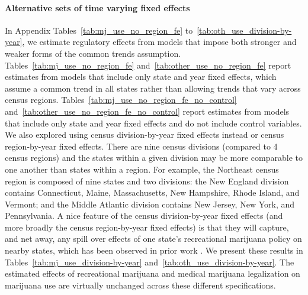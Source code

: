\documentclass[12pt]{article}%
\begin{document}
\paragraph{Alternative sets of time varying fixed effects}
In Appendix Tables~\ref{tab:mj_use_no_region_fe} to~\ref{tab:oth_use_division-by-year}, we estimate regulatory effects from models that impose both stronger and weaker forms of the common trends assumption. Tables~\ref{tab:mj_use_no_region_fe} and~\ref{tab:other_use_no_region_fe} report estimates from models that include only state and year fixed effects, which assume a common trend in all states rather than allowing trends that vary across census regions. Tables~\ref{tab:mj_use_no_region_fe_no_control} and~\ref{tab:other_use_no_region_fe_no_control} report estimates from models that include only state and year fixed effects and do not include control variables. 
We also explored using census division-by-year fixed effects instead or census region-by-year fixed effects. 
There are nine census divisions (compared to 4 census regions) and the states within a given division may be more comparable to one another than states within a region. 
For example, the Northeast census region is composed of nine states and two divisions: the New England division contains Connecticut, Maine, Massachusetts, New Hampshire, Rhode Island, and Vermont; and the Middle Atlantic division contains New Jersey, New York, and Pennsylvania. 
A nice feature of the census division-by-year fixed effects (and more broadly the census region-by-year fixed effects) is that they will capture, and net away, any spill over effects of one state's recreational marijuana policy on nearby states, which has been observed in prior work \citep{HanenSpillovers2020}. 
We present these results  in Tables~\ref{tab:mj_use_division-by-year} and~\ref{tab:oth_use_division-by-year}. 
The estimated effects of recreational marijuana and medical marijuana legalization on marijuana use are virtually unchanged across these different specifications. 

\end{document}
